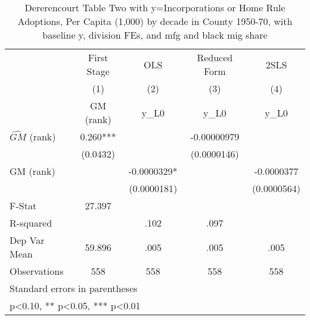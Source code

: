 \begin{table}[htbp]\centering
\def\sym#1{\ifmmode^{#1}\else\(^{#1}\)\fi}
\caption{Dererencourt Table Two with y=Incorporations or Home Rule Adoptions, Per Capita (1,000) by decade in County 1950-70, with baseline y, division FEs, and mfg and black mig share}
\begin{tabular}{l*{4}{c}}
\toprule
                    & First Stage   &         OLS   &Reduced Form   &        2SLS   \\
                    &\multicolumn{1}{c}{(1)}&\multicolumn{1}{c}{(2)}&\multicolumn{1}{c}{(3)}&\multicolumn{1}{c}{(4)}\\
                    &\multicolumn{1}{c}{GM  (rank)}&\multicolumn{1}{c}{y\_L0}&\multicolumn{1}{c}{y\_L0}&\multicolumn{1}{c}{y\_L0}\\
\midrule
$\hat{GM}$ (rank)   &       0.260***&               & -0.00000979   &               \\
                    &    (0.0432)   &               & (0.0000146)   &               \\
\addlinespace
GM  (rank)          &               &  -0.0000329*  &               &  -0.0000377   \\
                    &               & (0.0000181)   &               & (0.0000564)   \\
\midrule
F-Stat              &      27.397   &               &               &               \\
R-squared           &               &        .102   &        .097   &               \\
Dep Var Mean        &      59.896   &        .005   &        .005   &        .005   \\
Observations        &         558   &         558   &         558   &         558   \\
\bottomrule
\multicolumn{5}{l}{\footnotesize Standard errors in parentheses}\\
\multicolumn{5}{l}{\footnotesize * p<0.10, ** p<0.05, *** p<0.01}\\
\end{tabular}
\end{table}
